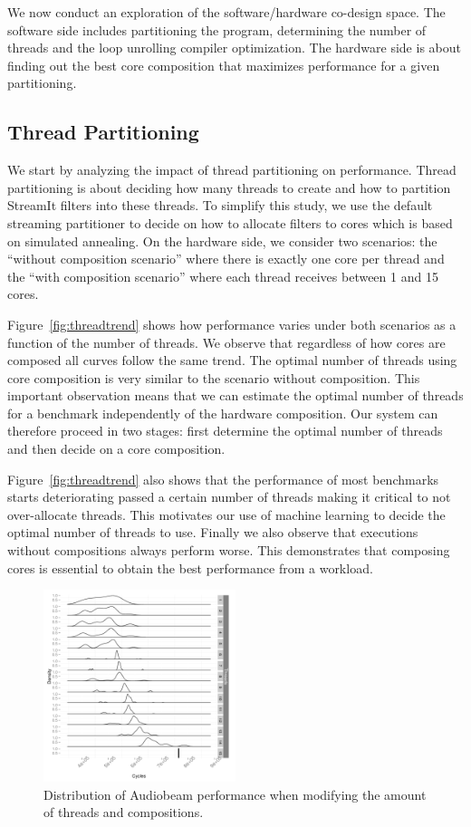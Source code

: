 We now conduct an exploration of the software/hardware co-design space.
The software side includes partitioning the program, determining the number of threads and the loop unrolling compiler optimization.
The hardware side is about finding out the best core composition that maximizes performance for a given partitioning.

\subsection{Thread Partitioning}

We start by analyzing the impact of thread partitioning on performance.
Thread partitioning is about deciding how many threads to create and how to partition StreamIt filters into these threads.
To simplify this study, we use the default streaming partitioner to decide on how to allocate filters to cores which is based on simulated annealing.
On the hardware side, we consider two scenarios:
the ``without composition scenario'' where there is exactly one core per thread and the ``with composition scenario'' where each thread receives between 1 and 15 cores.

Figure~\ref{fig:threadtrend} shows how performance varies under both scenarios as a function of the number of threads.
We observe that regardless of how cores are composed all curves follow the same trend.
The optimal number of threads using core composition is very similar to the scenario without composition.
This important observation means that we can estimate the optimal number of threads for a benchmark independently of the hardware composition.
Our system can therefore proceed in two stages: first determine the optimal number of threads and then decide on a core composition.

Figure~\ref{fig:threadtrend} also shows that the performance of most benchmarks starts deteriorating passed a certain number of threads making it critical to not over-allocate threads.
This motivates our use of machine learning to decide the optimal number of threads to use.
Finally we also observe that executions without compositions always perform worse.
This demonstrates that composing cores is essential to obtain the best performance from a workload.

\begin{figure}[t]
  \includegraphics[width=0.5\textwidth]{graphics/audiobeam_tots.pdf}
  \caption{Distribution of Audiobeam performance when modifying the amount of threads and compositions.}\label{fig:audiototal}
\end{figure}
\vspace{3mm}

